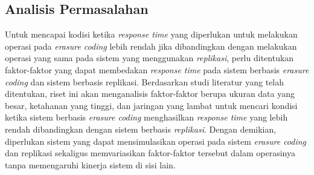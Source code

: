 \subsection{Analisis Permasalahan}
\label{sec:analisis-permasalahan}


Untuk mencapai kodisi ketika \textit{response time} yang diperlukan untuk melakukan operasi pada \textit{erasure coding} lebih rendah jika dibandingkan dengan melakukan operasi yang sama pada sistem yang menggunakan \textit{replikasi}, perlu ditentukan faktor-faktor yang dapat membedakan \textit{response time} pada sistem berbasis \textit{erasure coding} dan sistem berbasis replikasi. Berdasarkan studi literatur yang telah ditentukan, riset ini akan menganalisis faktor-faktor berupa ukuran data yang besar, ketahanan yang tinggi, dan jaringan yang lambat untuk mencari kondisi ketika sistem berbasis \textit{erasure coding} menghasilkan \textit{response time} yang lebih rendah dibandingkan dengan sistem berbasis \textit{replikasi}. Dengan demikian, diperlukan sistem yang dapat mensimulasikan operasi pada sistem \textit{erasure coding} dan replikasi sekaligus memvariasikan faktor-faktor tersebut dalam operasinya tanpa memengaruhi kinerja sistem di sisi lain.
  